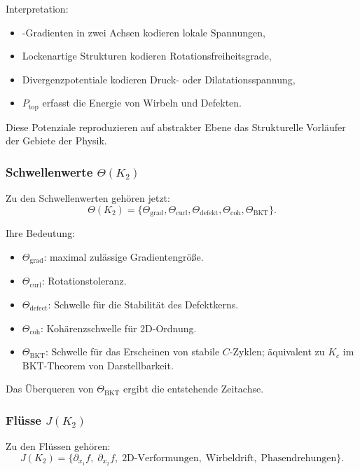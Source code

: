 Interpretation:
\begin{itemize}
    \item-Gradienten in zwei Achsen kodieren lokale Spannungen,
    \item Lockenartige Strukturen kodieren Rotationsfreiheitsgrade,
    \item Divergenzpotentiale kodieren Druck- oder Dilatationsspannung,
    \item $P_{\mathrm{top}}$ erfasst die Energie von Wirbeln und Defekten.
\end{itemize}

Diese Potenziale reproduzieren auf abstrakter Ebene das Strukturelle
Vorläufer der Gebiete der Physik.

\subsubsection{Schwellenwerte \texorpdfstring{$\Theta(K_2)$}{\Theta(K_2)}}

Zu den Schwellenwerten gehören jetzt:
\[
\Theta(K_2) =
\{\Theta_{\mathrm{grad}}, \Theta_{\mathrm{curl}},
  \Theta_{\mathrm{defekt}}, \Theta_{\mathrm{coh}},
  \Theta_{\mathrm{BKT}}\}.
\]

Ihre Bedeutung:
\begin{itemize}
    \item $\Theta_{\mathrm{grad}}$: maximal zulässige Gradientengröße.
    \item $\Theta_{\mathrm{curl}}$: Rotationstoleranz.
    \item $\Theta_{\mathrm{defect}}$: Schwelle für die Stabilität des Defektkerns.
    \item $\Theta_{\mathrm{coh}}$: Kohärenzschwelle für 2D-Ordnung.
    \item $\Theta_{\mathrm{BKT}}$: Schwelle für das Erscheinen von
          stabile $C$-Zyklen; äquivalent zu $K_c$ im BKT-Theorem von
          Darstellbarkeit.
\end{itemize}

Das Überqueren von $\Theta_{\mathrm{BKT}}$ ergibt die entstehende Zeitachse.

\subsubsection{Flüsse \texorpdfstring{$J(K_2)$}{J(K_2)}}

Zu den Flüssen gehören:
\[
J(K_2) = \{\partial_{x_1} f,\; \partial_{x_2} f,\;
\text{2D-Verformungen},\; \text{Wirbeldrift},\; \text{Phasendrehungen}\}.
\]

